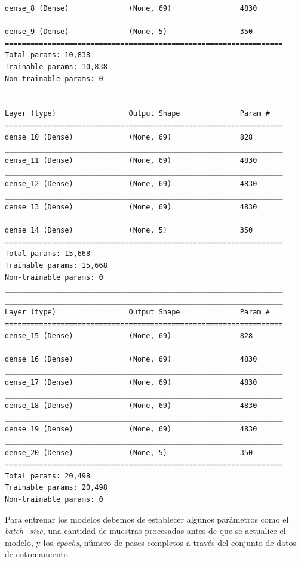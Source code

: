 \documentclass[12pt,twoside]{report}
\begin{document}
\begin{lstlisting}
dense_8 (Dense)              (None, 69)                4830      
_________________________________________________________________
dense_9 (Dense)              (None, 5)                 350       
=================================================================
Total params: 10,838
Trainable params: 10,838
Non-trainable params: 0
_________________________________________________________________
_________________________________________________________________
Layer (type)                 Output Shape              Param #   
=================================================================
dense_10 (Dense)             (None, 69)                828       
_________________________________________________________________
dense_11 (Dense)             (None, 69)                4830      
_________________________________________________________________
dense_12 (Dense)             (None, 69)                4830      
_________________________________________________________________
dense_13 (Dense)             (None, 69)                4830      
_________________________________________________________________
dense_14 (Dense)             (None, 5)                 350       
=================================================================
Total params: 15,668
Trainable params: 15,668
Non-trainable params: 0
_________________________________________________________________
_________________________________________________________________
Layer (type)                 Output Shape              Param #   
=================================================================
dense_15 (Dense)             (None, 69)                828       
_________________________________________________________________
dense_16 (Dense)             (None, 69)                4830      
_________________________________________________________________
dense_17 (Dense)             (None, 69)                4830      
_________________________________________________________________
dense_18 (Dense)             (None, 69)                4830      
_________________________________________________________________
dense_19 (Dense)             (None, 69)                4830      
_________________________________________________________________
dense_20 (Dense)             (None, 5)                 350       
=================================================================
Total params: 20,498
Trainable params: 20,498
Non-trainable params: 0
\end{lstlisting}

Para entrenar los modelos debemos de establecer algunos parámetros como el \textit{batch\_size}, una cantidad de muestras procesadas antes de que se actualice el modelo, y los \textit{epochs}, número de pases completos a través del conjunto de datos de entrenamiento.
\end{document}
